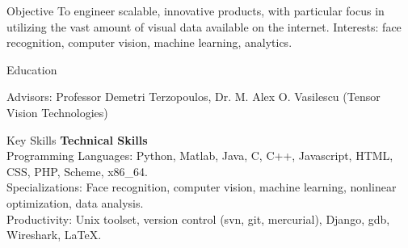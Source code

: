 \documentclass{resume}
\begin{document}
\maketitle
\thispagestyle{empty} %

\vspace{-0.5em}

\begin{component}{Objective}
To engineer scalable, innovative products, with particular focus in utilizing the vast amount of visual data available on the internet.
Interests: face recognition, computer vision, machine learning, analytics.\\
\end{component}

\vspace{-0.5em}

\begin{component}{Education}

    \hspace{2em} Advisors: Professor Demetri Terzopoulos, Dr. M. Alex O. Vasilescu (Tensor Vision Technologies)
    
\end{component}

\vspace{0.5em}

\begin{component}{Key Skills}
	\textbf{Technical Skills}\\
		Programming Languages: Python, Matlab, Java, C, C++, Javascript, HTML, CSS, PHP, Scheme, x86\_64.\\
        Specializations: Face recognition, computer vision, machine learning, nonlinear optimization, data analysis.\\
		Productivity: Unix toolset, version control (svn, git, mercurial), Django, gdb, Wireshark, LaTeX.
\end{component}

\vspace{0.5em}
\end{document}
